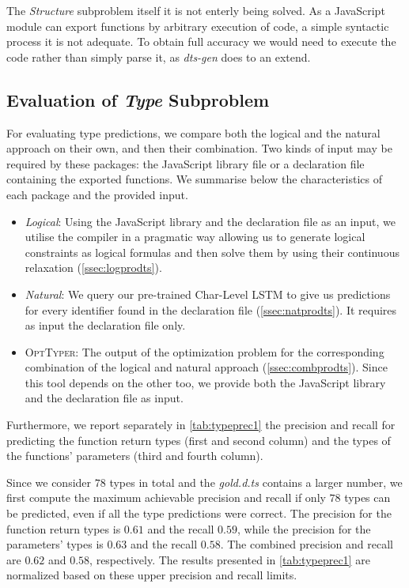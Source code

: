 \documentclass[sigplan,10pt,review,anonymous]{acmart} %
\newcommand{\projectname}{\textsc{OptTyper}\xspace}
\theoremstyle{plain}
\theoremstyle{remark}
\theoremstyle{definition}
\begin{document}
The \textit{Structure} subproblem itself it is not enterly being solved.  As a JavaScript module can export functions by arbitrary execution of code, a simple syntactic process it is not adequate. To obtain full accuracy we would need to execute the code rather than simply parse it, as \textit{dts-gen} does to an extend.
\subsection{Evaluation of \textit{Type} Subproblem}
For evaluating type predictions,
we compare both the logical and the natural approach on their own,
and then their combination.
Two kinds of input may be required by these packages:
the JavaScript library file or a declaration file containing the exported functions.
We summarise below the characteristics of each package and the provided input.
\begin{itemize}[label={\tiny$\bullet$}]
	\item \textit{Logical}: Using the JavaScript library and the declaration file as an input,
	      we utilise the compiler in a pragmatic way allowing us to generate logical constraints as logical formulas
	      and then solve them by using their continuous relaxation (\cref{ssec:logprodts}).
	\item \textit{Natural}: We query our pre-trained Char-Level LSTM to give us predictions for every identifier
	      found in the declaration file (\cref{ssec:natprodts}).
	      It requires as input the declaration file only.
	\item \projectname: The output of the optimization problem for the corresponding combination of the logical
	      and natural approach (\cref{ssec:combprodts}).
	      Since this tool depends on the other too, we provide both the JavaScript library
	      and the declaration file as input.
\end{itemize}
Furthermore, we report separately in \cref{tab:typeprec1} the precision and recall for predicting the function return types (first and second column) and the types of the functions' parameters (third and fourth column).

Since we consider $78$ types in total and the \textit{gold.d.ts} contains a larger number,
we first compute the maximum achievable precision and recall if only $78$ types can be predicted,
even if all the type predictions were correct.
The precision for the function return types is $0.61$ and the recall $0.59$,
while the precision for the parameters' types is $0.63$ and the recall $0.58$.
The combined precision and recall are $0.62$ and $0.58$, respectively.
The results presented in \cref{tab:typeprec1} are normalized based on these upper precision and recall limits.
\end{document}
